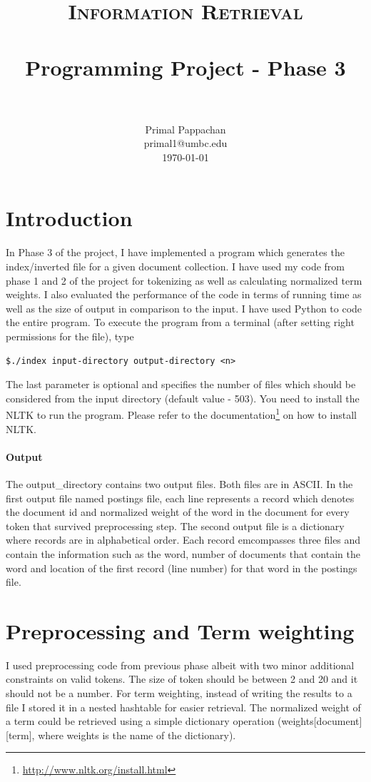 \documentclass[paper=a4, fontsize=11pt]{scrartcl}
\title{
		\usefont{OT1}{bch}{b}{n}
		\normalfont \normalsize \textsc{Information Retrieval} \\ [25pt]
		\horrule{0.5pt} \\[0.4cm]
		\huge Programming Project - Phase 3 \\
		\horrule{2pt} \\[0.5cm]
}
\author{
		\normalfont 								\normalsize
        Primal Pappachan\\[-3pt]		\normalsize
        primal1@umbc.edu\\[-3pt]		\normalsize
        \today
}
\date{}
\numberwithin{equation}{section}		%
\numberwithin{figure}{section}			%
\numberwithin{table}{section}				%
\begin{document}
\maketitle
\section{Introduction}
In Phase 3 of the project, I have implemented a program which generates the index/inverted file for a given document collection. I have used my code from phase 1 and 2 of the project for tokenizing as well as calculating normalized term weights.  I also evaluated the performance of the code in terms of running time as well as the size of output in comparison to the input. I have used Python to code the entire program. To execute the program from a terminal (after setting right permissions for the file), type 

\begin{verbatim}
$./index input-directory output-directory <n>
\end{verbatim}

The last parameter is optional and specifies the number of files which should be considered from the input directory (default value - 503). You need to install the NLTK to run the program. Please refer to the documentation\footnote{\url{http://www.nltk.org/install.html}} on how to install NLTK.

\paragraph{Output}

The output\_directory contains two output files. Both files are in ASCII. In the first output file named postings file, each line represents a record which denotes the document id and normalized weight of the word in the document for every token that survived preprocessing step. The second output file is a dictionary where records are in alphabetical order. Each record emcompasses three files and contain the information such as the word, number of documents that contain the word and location of the first record (line number) for that word in the postings file.

\section{Preprocessing and Term weighting}

I used preprocessing code from previous phase albeit with two minor additional constraints on valid tokens. The size of token should be between 2 and 20 and it should not be a number. For term weighting, instead of writing the results to a file I stored it in a nested hashtable for easier retrieval. The normalized weight of a term could be retrieved using a simple dictionary operation (weights[document][term], where weights is the name of the dictionary).
\end{document}
